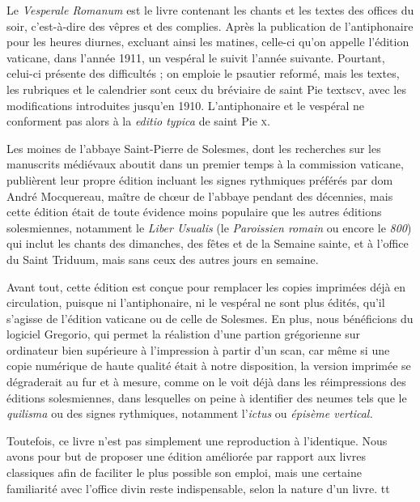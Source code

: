 
\begin{frpars}
Le \textit{Vesperale Romanum} est le livre contenant les chants et les textes des offices du soir, c’est-à-dire des vêpres et des complies. Après la publication de l'antiphonaire pour les heures diurnes, excluant ainsi les matines, celle-ci qu'on appelle l'édition vaticane, dans l'année 1911, un vespéral le suivit l'année suivante. Pourtant, celui-ci présente des difficultés ; on emploie le psautier reformé, mais les textes, les rubriques et le calendrier sont ceux du bréviaire de saint Pie textsc{v}, avec les modifications introduites jusqu'en 1910. L'antiphonaire et le vespéral ne conforment pas alors à la \textit{editio typica} de saint Pie \textsc{x}.

Les moines de l'abbaye Saint-Pierre de Solesmes, dont les recherches sur les manuscrits médiévaux aboutit dans un premier temps à la commission vaticane, publièrent leur propre édition incluant les signes rythmiques préférés par dom André Mocquereau, maître de chœur de l'abbaye pendant des décennies, mais cette édition était de toute évidence moins populaire que les autres éditions solesmiennes, notamment le \textit{Liber Usualis} (le \textit{Paroissien romain} ou encore le \textit{800}) qui inclut les chants des dimanches, des fêtes et de la Semaine sainte, et à l'office du Saint Triduum, mais sans ceux des autres jours en semaine.


Avant tout, cette édition est conçue pour remplacer les copies imprimées déjà en circulation, puisque ni l'antiphonaire, ni le vespéral ne sont plus édités, qu'il s'agisse de l'édition vaticane ou de celle de Solesmes. En plus, nous bénéficions du logiciel Gregorio, qui permet la réalistion d'une partion grégorienne sur ordinateur bien supérieure à l'impression à partir d'un scan, car même si une copie numérique de haute qualité était à notre disposition, la version imprimée se dégraderait au fur et à mesure, comme on le voit déjà dans les réimpressions des éditions solesmiennes, dans lesquelles on peine à identifier des neumes tels que le \textit{quilisma} ou des signes rythmiques, notamment l'\textit{ictus} ou \textit{épisème vertical.}

Toutefois, ce livre n'est pas simplement une reproduction à l'identique. Nous avons pour but de proposer une édition améliorée par rapport aux livres classiques afin de faciliter le plus possible son emploi, mais une certaine familiarité avec l'office divin reste indispensable, selon la nature d'un livre.
tt


\end{frpars}
